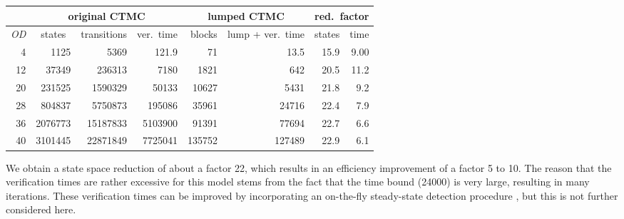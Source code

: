 \documentclass{llncs}
\begin{document}
{\scriptsize
\begin{center}
\begin{tabular}{|r|r|r|r|r|r|r|r|}
\hline 
& \multicolumn{3}{c|}{original CTMC} & \multicolumn{2}{c|}{lumped CTMC} & \multicolumn{2}{c|}{red.\ factor} \\[1ex] \hline 
     {\it OD}            & \multicolumn{1}{c|}{states} &transitions& \multicolumn{1}{c|}{ver.\ time} &blocks& lump + ver.\ time& states       & time \\ \hline
 4    & 1125      & 5369               & 121.9                                & 71         & 13.5      & 15.9    & 9.00     \\
 12   & 37349     & 236313      & 7180\phantom{.0}            & 1821     & 642\phantom{.0}      & 20.5    & 11.2    \\
 20   & 231525    & 1590329     & 50133\phantom{.0}       & 10627    & 5431\phantom{.0}  & 21.8    & 9.2     \\
 28   & 804837    & 5750873     & 195086\phantom{.0}     & 35961    & 24716\phantom{.0}  & 22.4    & 7.9     \\
 36   & 2076773   & 15187833    & 5103900\phantom{.0}   & 91391    & 77694\phantom{.0}  & 22.7    & 6.6     \\
 40   & 3101445   & 22871849    & 7725041\phantom{.0}  & 135752   & 127489\phantom{.0}  & 22.9    & 6.1    \\ \hline
\end{tabular}
\end{center}
}
%
\noindent We obtain a state space reduction of about a factor 22, which results in an efficiency improvement
of a factor 5 to 10.
The reason that the verification times are rather excessive for this model stems from the fact that
the time bound (24000) is very large, resulting in many iterations.
These verification times can be improved by incorporating an on-the-fly steady-state 
detection procedure \cite{KatoenZ_QEST06}, but this is not further considered here. 
\end{document}
